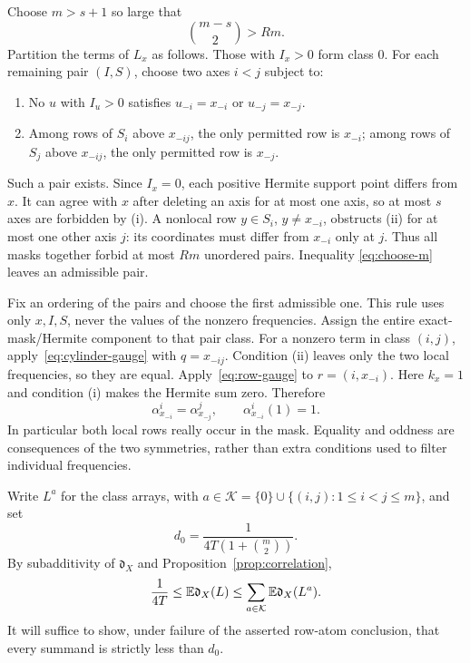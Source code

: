 Choose $m>s+1$ so large that
\begin{equation}\label{eq:choose-m}
 \binom{m-s}{2}>Rm.
\end{equation}
Partition the terms of $L_x$ as follows. Those with $I_x>0$ form class
$0$. For each remaining pair $(I,S)$, choose two axes $i<j$ subject to:
\begin{enumerate}[label=(\roman*),leftmargin=*]
 \item No $u$ with $I_u>0$ satisfies $u_{-i}=x_{-i}$ or
       $u_{-j}=x_{-j}$.
 \item Among rows of $S_i$ above $x_{-ij}$, the only permitted row is
       $x_{-i}$; among rows of $S_j$ above $x_{-ij}$, the only permitted
       row is $x_{-j}$.
\end{enumerate}
Such a pair exists. Since $I_x=0$, each positive Hermite support point
differs from $x$. It can agree with $x$ after deleting an axis for at
most one axis, so at most $s$ axes are forbidden by (i). A nonlocal row
$y\in S_i$, $y\ne x_{-i}$, obstructs (ii) for at most one other axis
$j$: its coordinates must differ from $x_{-i}$ only at $j$. Thus all
masks together forbid at most $Rm$ unordered pairs. Inequality
\eqref{eq:choose-m} leaves an admissible pair.

Fix an ordering of the pairs and choose the first admissible one. This
rule uses only $x,I,S$, never the values of the nonzero frequencies.
Assign the entire exact-mask/Hermite component to that pair class.
For a nonzero term in class $(i,j)$, apply~\eqref{eq:cylinder-gauge}
with $q=x_{-ij}$. Condition (ii) leaves only the two local frequencies,
so they are equal. Apply~\eqref{eq:row-gauge} to
$r=(i,x_{-i})$. Here $k_x=1$ and condition (i) makes the Hermite sum
zero. Therefore
\begin{equation}\label{eq:matching-odd}
 \alpha^i_{x_{-i}}=\alpha^j_{x_{-j}},
 \qquad \alpha^i_{x_{-i}}(1)=1.
\end{equation}
In particular both local rows really occur in the mask. Equality and
oddness are consequences of the two symmetries, rather than extra
conditions used to filter individual frequencies.

Write $L^a$ for the class arrays, with
$a\in\mathcal K=\{0\}\cup\{(i,j):1\le i<j\le m\}$, and set
\begin{equation}\label{eq:class-target}
 d_0=\frac{1}{4T(1+\binom m2)}.
\end{equation}
By subadditivity of $\mathfrak d_X$ and Proposition~\ref{prop:correlation},
\begin{equation}\label{eq:class-correlation-lower}
 \frac1{4T}\le\mathbb E\mathfrak d_X(L)
 \le\sum_{a\in\mathcal K}\mathbb E\mathfrak d_X(L^a).
\end{equation}
It will suffice to show, under failure of the asserted row-atom
conclusion, that every summand is strictly less than $d_0$.

